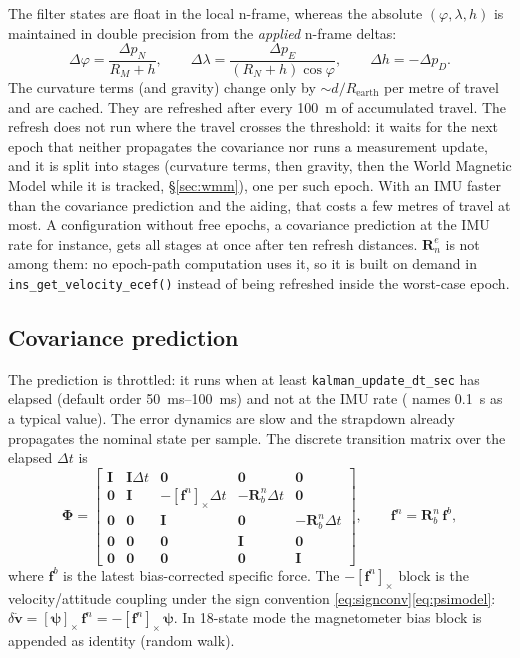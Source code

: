 \documentclass[11pt,a4paper]{article}
\newcommand{\vect}[1]{\bm{#1}}
\newcommand{\mat}[1]{\bm{#1}}
\newcommand{\cross}[1]{\left[#1\right]_{\times}}   %
\newcommand{\nframe}{n}
\newcommand{\bframe}{b}
\newcommand{\eframe}{e}
\newcommand{\Rbn}{\mat{R}_{\bframe}^{\nframe}}
\newcommand{\Rne}{\mat{R}_{\nframe}^{\eframe}}
\newcommand{\dt}{\Delta t}
\newcommand{\code}[1]{\texttt{#1}}
\begin{document}
The filter states are float in the local n-frame, whereas the absolute
$(\varphi, \lambda, h)$ is maintained in double precision from the
\emph{applied} n-frame deltas:
\begin{equation}
  \Delta\varphi = \frac{\Delta p_N}{R_M + h}, \qquad
  \Delta\lambda = \frac{\Delta p_E}{(R_N + h)\cos\varphi}, \qquad
  \Delta h = -\Delta p_D .
\end{equation}
The curvature terms (and gravity) change only by
$\sim d / R_{\text{earth}}$ per metre of travel and are cached. They are
refreshed after every \SI{100}{\metre} of accumulated travel. The
refresh does not run where the travel crosses the threshold: it waits for
the next epoch that neither propagates the covariance nor runs a
measurement update, and it is split into stages (curvature terms, then
gravity, then the World Magnetic Model while it is tracked,
\S\ref{sec:wmm}), one per such epoch. With an IMU faster than the covariance
prediction and the aiding, that costs a few metres of travel at most.
A configuration without free epochs, a covariance prediction at the IMU
rate for instance, gets all stages at once after ten refresh distances.
$\Rne$ is
not among them: no epoch-path computation uses it, so it is
built on demand in \code{ins\_\allowbreak{}get\_\allowbreak{}velocity\_\allowbreak{}ecef()}
instead of being refreshed inside the worst-case epoch.

\subsection{Covariance prediction}
\label{sec:predict}

The prediction is throttled: it runs when at least
\code{kalman\_\allowbreak{}update\_\allowbreak{}dt\_\allowbreak{}sec} has elapsed (default order
\SIrange{50}{100}{\milli\second}) and not at the IMU rate (\cite{wendel2011}
names \SI{0.1}{\second} as a typical value). The error dynamics
are slow and the strapdown already propagates the nominal state per
sample. The discrete transition matrix over the elapsed $\dt$ is
\cite[eq.~10.1]{wendel2011}
\begin{equation}
  \mat{\Phi} =
  \begin{bmatrix}
    \mat{I} & \mat{I}\dt & \mat{0} & \mat{0} & \mat{0} \\
    \mat{0} & \mat{I} & -\cross{\vect{f}^\nframe}\dt & -\Rbn\dt & \mat{0} \\
    \mat{0} & \mat{0} & \mat{I} & \mat{0} & -\Rbn\dt \\
    \mat{0} & \mat{0} & \mat{0} & \mat{I} & \mat{0} \\
    \mat{0} & \mat{0} & \mat{0} & \mat{0} & \mat{I}
  \end{bmatrix},
  \qquad
  \vect{f}^\nframe = \Rbn\,\vect{f}^\bframe ,
  \label{eq:phi}
\end{equation}
where $\vect{f}^\bframe$ is the latest bias-corrected specific force.
The $-\cross{\vect{f}^\nframe}$ block is the velocity/attitude coupling
under the sign convention \eqref{eq:signconv}\eqref{eq:psimodel}:
$\delta\dot{\vect{v}} = \cross{\vect{\psi}}\,\vect{f}^\nframe
= -\cross{\vect{f}^\nframe}\,\vect{\psi}$. In 18-state mode the
magnetometer bias block is appended as identity (random walk).
\end{document}
